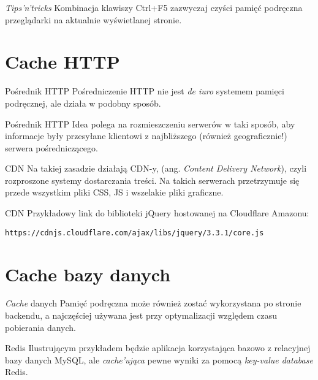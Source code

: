 \begin{frame}{\emph{Tips'n'tricks}}
	Kombinacja klawiszy Ctrl+F5 zazwyczaj czyści pamięć podręczna przeglądarki na aktualnie wyświetlanej stronie.
\end{frame}

\section{Cache HTTP}

\begin{frame}{Pośrednik HTTP}
	Pośredniczenie HTTP nie jest \emph{de iuro} systemem pamięci podręcznej, ale działa w podobny sposób.
\end{frame}

\begin{frame}{Pośrednik HTTP}
	Idea polega na rozmieszczeniu serwerów w taki sposób, aby informacje były przesyłane klientowi z najbliższego (również geograficznie!) serwera pośredniczącego.
\end{frame}

\begin{frame}{CDN}
	Na takiej zasadzie działają CDN-y, (ang. \emph{Content Delivery Network}), czyli rozproszone systemy dostarczania treści. Na takich serwerach przetrzymuje się przede wszystkim pliki CSS, JS i wszelakie pliki graficzne.
\end{frame}

\begin{frame}{CDN}
	Przykładowy link do biblioteki jQuery hostowanej na Cloudflare Amazonu:
	
	\texttt{https://cdnjs.cloudflare.com/ajax/libs/jquery/3.3.1/core.js}
\end{frame}

\section{Cache bazy danych}

\begin{frame}{\emph{Cache} danych}
	Pamięć podręczna może również zostać wykorzystana po stronie backendu, a najczęściej używana jest przy optymalizacji względem czasu pobierania danych. 
\end{frame}

\begin{frame}{Redis}
	Ilustrującym przykładem będzie aplikacja korzystająca bazowo z relacyjnej bazy danych MySQL, ale \emph{cache'ująca} pewne wyniki za pomocą \emph{key-value database} Redis.
\end{frame}

